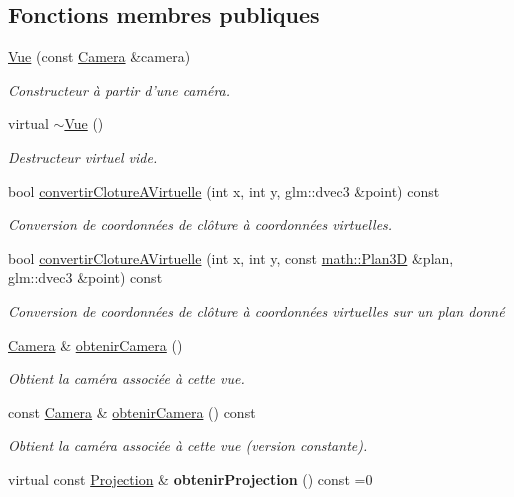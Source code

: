 \subsection*{Fonctions membres publiques}
\begin{DoxyCompactItemize}
\item 
\hyperlink{classvue_1_1_vue_a61e0650d91fee934f162f324d6b39efe}{Vue} (const \hyperlink{classvue_1_1_camera}{Camera} \&camera)
\begin{DoxyCompactList}\small\item\em Constructeur à partir d'une caméra. \end{DoxyCompactList}\item 
\hypertarget{classvue_1_1_vue_a60df66ac1ee34a4d48fbbbda05c041b2}{virtual \hyperlink{classvue_1_1_vue_a60df66ac1ee34a4d48fbbbda05c041b2}{$\sim$\-Vue} ()}\label{classvue_1_1_vue_a60df66ac1ee34a4d48fbbbda05c041b2}

\begin{DoxyCompactList}\small\item\em Destructeur virtuel vide. \end{DoxyCompactList}\item 
bool \hyperlink{classvue_1_1_vue_a16f3478805bc7e0e9b42caeb0c418fa5}{convertir\-Cloture\-A\-Virtuelle} (int x, int y, glm\-::dvec3 \&point) const 
\begin{DoxyCompactList}\small\item\em Conversion de coordonnées de clôture à coordonnées virtuelles. \end{DoxyCompactList}\item 
bool \hyperlink{classvue_1_1_vue_a7f25d1c50b1ac550f8faa510e560311d}{convertir\-Cloture\-A\-Virtuelle} (int x, int y, const \hyperlink{classmath_1_1_plan3_d}{math\-::\-Plan3\-D} \&plan, glm\-::dvec3 \&point) const 
\begin{DoxyCompactList}\small\item\em Conversion de coordonnées de clôture à coordonnées virtuelles sur un plan donné \end{DoxyCompactList}\item 
\hyperlink{classvue_1_1_camera}{Camera} \& \hyperlink{classvue_1_1_vue_a6c4dd99b71433d228918cbbdb65b2895}{obtenir\-Camera} ()
\begin{DoxyCompactList}\small\item\em Obtient la caméra associée à cette vue. \end{DoxyCompactList}\item 
const \hyperlink{classvue_1_1_camera}{Camera} \& \hyperlink{classvue_1_1_vue_af13f29f708c59fada3794e1e0a20c5b3}{obtenir\-Camera} () const 
\begin{DoxyCompactList}\small\item\em Obtient la caméra associée à cette vue (version constante). \end{DoxyCompactList}\item 
\hypertarget{classvue_1_1_vue_a52bbe1f5a6491345eea1162d546aeafb}{virtual const \hyperlink{classvue_1_1_projection}{Projection} \& {\bfseries obtenir\-Projection} () const =0}\label{classvue_1_1_vue_a52bbe1f5a6491345eea1162d546aeafb}


\end{DoxyCompactItemize}
